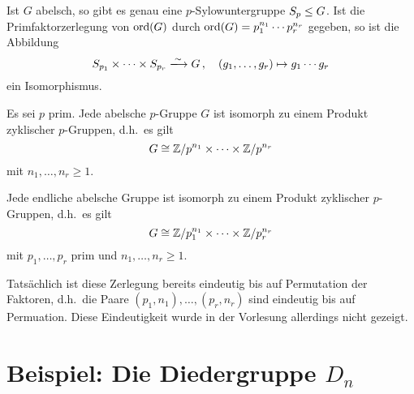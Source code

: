 \begin{theorem}
  Ist $G$ abelsch, so gibt es genau eine $p$-Sylowuntergruppe $S_p \mathrel{\leq} G$.
  Ist die Primfaktorzerlegung von $\operatorname{ord}(G)$ durch $\operatorname{ord}(G) = p_1^{n_1} \dotsm p_r^{n_r}$ gegeben, so ist die Abbildung
  \[
                            S_{p_1} \times \dotsb \times S_{p_r}
    \xlongrightarrow{\sim}  G \,,
    \quad                   (g_1, \dotsc, g_r)
    \mapsto                 g_1 \dotsm g_r
  \]
  ein Isomorphismus.
\end{theorem}

\begin{proposition}
  Es sei $p$ prim.
  Jede abelsche $p$-Gruppe $G$ ist isomorph zu einem Produkt zyklischer $p$-Gruppen, d.h.\ es gilt
  \[
          G
    \cong \mathbb{Z}/p^{n_1} \times \dotsm \times \mathbb{Z}/p^{n_r}
  \]
  mit $n_1, \dotsc, n_r \geq 1$.
\end{proposition}

\begin{corollary}
  Jede endliche abelsche Gruppe ist isomorph zu einem Produkt zyklischer $p$-Gruppen, d.h.\ es gilt
  \[
          G
    \cong \mathbb{Z}/p_1^{n_1} \times \dotsm \times \mathbb{Z}/p_r^{n_r}
  \]
  mit $p_1, \dotsc, p_r$ prim und $n_1, \dotsc, n_r \geq 1$.
\end{corollary}

\begin{remark}
  Tatsächlich ist diese Zerlegung bereits eindeutig bis auf Permutation der Faktoren, d.h.\ die Paare $(p_1, n_1), \dotsc, (p_r, n_r)$ sind eindeutig bis auf Permuation.
  Diese Eindeutigkeit wurde in der Vorlesung allerdings nicht gezeigt.
\end{remark}





\section{Beispiel: Die Diedergruppe \texorpdfstring{$D_n$}{D\_n}}

